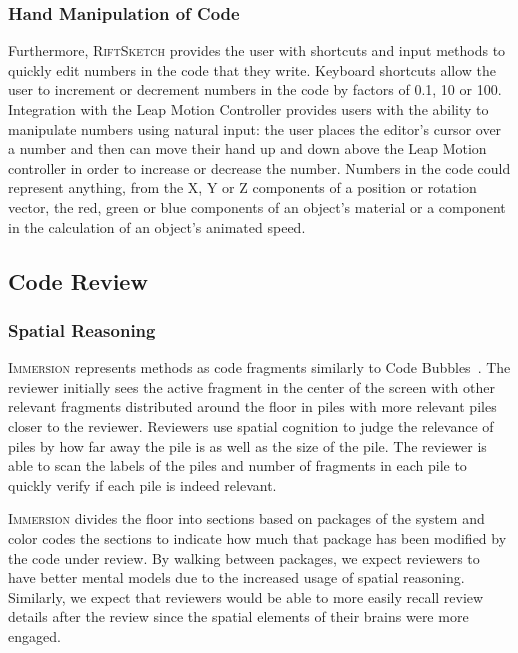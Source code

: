 \documentclass[conference]{IEEEtran}
\begin{document}
\subsubsection{Hand Manipulation of Code}

Furthermore, \textsc{RiftSketch} provides the user with shortcuts and input methods to quickly edit numbers in the code that they write. 
Keyboard shortcuts allow the user to increment or decrement numbers in the code by factors of 0.1, 10 or 100. 
Integration with the Leap Motion Controller provides users with the ability to manipulate numbers using natural input: the user places the editor's cursor over a number and then can move their hand up and down above the Leap Motion controller in order to increase or decrease the number. 
Numbers in the code could represent anything, from the X, Y or Z components of a position or rotation vector, the red, green or blue components of an object's material or a component in the calculation of an object's animated speed.


\subsection{Code Review}

\subsubsection{Spatial Reasoning}

\textsc{Immersion} represents methods as code fragments similarly to Code Bubbles~\cite{Bragdon:CodeBubbles}.  
The reviewer initially sees the active fragment in the center of the screen with other relevant fragments distributed around the floor in piles with more relevant piles closer to the reviewer. 
Reviewers use spatial cognition to judge the relevance of piles by how far away the pile is as well as the size of the pile. 
The reviewer is able to scan the labels of the piles and number of fragments in each pile to quickly verify if each pile is indeed relevant.

\textsc{Immersion} divides the floor into sections based on packages of the system and color codes the sections to indicate how much that package has been modified by the code under review.
By walking between packages, we expect reviewers to have better mental models due to the increased usage of spatial reasoning.
Similarly, we expect that reviewers would be able to more easily recall review details after the review since the spatial elements of their brains were more engaged.
\end{document}
